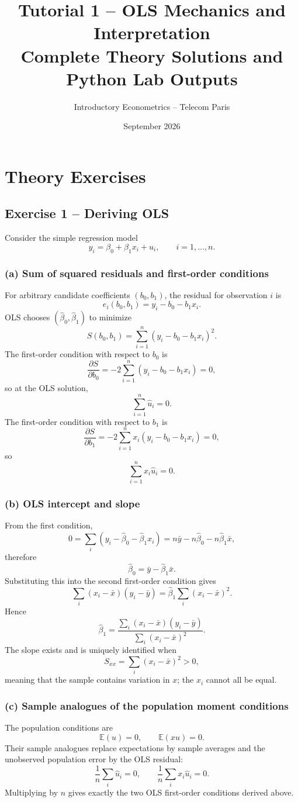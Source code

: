 \documentclass[11pt,a4paper]{article}
\title{\textbf{Tutorial 1 -- OLS Mechanics and Interpretation}\\
\large Complete Theory Solutions and Python Lab Outputs}
\author{Introductory Econometrics -- Telecom Paris}
\date{September 2026}
\newcommand{\E}{\mathbb{E}}
\newcommand{\Sxx}{S_{xx}}
\begin{document}
\maketitle
\tableofcontents
\newpage

\section{Theory Exercises}

\subsection{Exercise 1 -- Deriving OLS}
Consider the simple regression model
\[
 y_i=\beta_0+\beta_1x_i+u_i, \qquad i=1,\ldots,n.
\]

\subsubsection*{(a) Sum of squared residuals and first-order conditions}
For arbitrary candidate coefficients $(b_0,b_1)$, the residual for observation $i$ is
\[
 e_i(b_0,b_1)=y_i-b_0-b_1x_i.
\]
OLS chooses $(\hat\beta_0,\hat\beta_1)$ to minimize
\[
 S(b_0,b_1)=\sum_{i=1}^n (y_i-b_0-b_1x_i)^2.
\]
The first-order condition with respect to $b_0$ is
\[
 \frac{\partial S}{\partial b_0}
 =-2\sum_{i=1}^n(y_i-b_0-b_1x_i)=0,
\]
so at the OLS solution,
\[
 \boxed{\sum_{i=1}^n \hat u_i=0}.
\]
The first-order condition with respect to $b_1$ is
\[
 \frac{\partial S}{\partial b_1}
 =-2\sum_{i=1}^n x_i(y_i-b_0-b_1x_i)=0,
\]
so
\[
 \boxed{\sum_{i=1}^n x_i\hat u_i=0}.
\]

\subsubsection*{(b) OLS intercept and slope}
From the first condition,
\[
 0=\sum_i(y_i-\hat\beta_0-\hat\beta_1x_i)
 =n\bar y-n\hat\beta_0-n\hat\beta_1\bar x,
\]
therefore
\[
 \boxed{\hat\beta_0=\bar y-\hat\beta_1\bar x}.
\]
Substituting this into the second first-order condition gives
\[
 \sum_i (x_i-\bar x)(y_i-\bar y)
 =\hat\beta_1\sum_i(x_i-\bar x)^2.
\]
Hence
\[
 \boxed{
 \hat\beta_1=
 \frac{\sum_i(x_i-\bar x)(y_i-\bar y)}
 {\sum_i(x_i-\bar x)^2}
 }.
\]
The slope exists and is uniquely identified when
\[
 \boxed{\Sxx=\sum_i(x_i-\bar x)^2>0},
\]
meaning that the sample contains variation in $x$; the $x_i$ cannot all be equal.

\subsubsection*{(c) Sample analogues of the population moment conditions}
The population conditions are
\[
 \E(u)=0, \qquad \E(xu)=0.
\]
Their sample analogues replace expectations by sample averages and the unobserved population error by the OLS residual:
\[
 \frac{1}{n}\sum_i\hat u_i=0,
 \qquad
 \frac{1}{n}\sum_i x_i\hat u_i=0.
\]
Multiplying by $n$ gives exactly the two OLS first-order conditions derived above.
\end{document}
